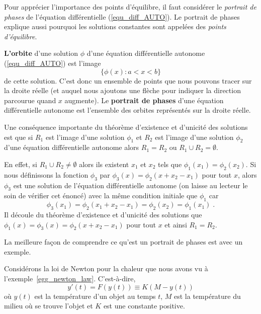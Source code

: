 {Pour apprécier l'importance des points d'équilibre, il faut considérer
le {\em portrait de phases} de l'équation différentielle
(\ref{equ_diff_AUTO}).  Le portrait de phases explique aussi pourquoi
les solutions constantes sont appelées des {\em points d'équilibre}.

\begin{focus}{\dfn}
{\bfseries L'orbite} d'une solution $\phi$ d'une équation
différentielle autonome (\ref{equ_diff_AUTO}) est l'image
\[
\{ \phi(x) :  a < x < b \}
\]
de cette solution.  C'est donc un ensemble de points que nous pouvons
tracer sur la droite réelle (et auquel nous ajoutons une flèche pour
indiquer la direction parcourue quand $x$ augmente).
Le {\bfseries portrait de phases} d'une équation différentielle
autonome est l'ensemble des orbites représentés sur la droite
réelle. 
\end{focus}

\begin{rmk}[\theory]
Une conséquence importante du théorème d'existence et d'unicité des
solutions est que si $R_1$ est l'image d'une solution $\phi_1$ et
$R_2$ est l'image d'une solution $\phi_2$ d'une équation
différentielle autonome alors $R_1 = R_2$ ou $R_1 \cup R_2 = \emptyset$. 

En effet, si $R_1 \cup R_2 \neq \emptyset$ alors ils existent $x_1$ et
$x_2$ tels que $\phi_1(x_1) = \phi_2(x_2)$.  Si nous définissons la fonction
$\phi_3$ par $\phi_3(x) = \phi_2(x+x_2-x_1)$ pour tout $x$, alors
$\phi_3$ est une solution de l'équation différentielle autonome (on
laisse au lecteur le soin de vérifier cet énoncé) avec la même
condition initiale que $\phi_1$ car
\[
\phi_3(x_1) = \phi_2(x_1+x_2-x_1) = \phi_2(x_2) = \phi_1(x_1) \; .
\]
Il découle du théorème d'existence et d'unicité des solutions que
$\phi_1(x) = \phi_3(x) = \phi_2(x+x_2-x_1)$ pour tout $x$ et ainsi
$R_1 = R_2$.
\label{dist_img}
\end{rmk}

La meilleure façon de comprendre ce qu'est un portrait de phases est
avec un exemple.

\begin{egg}
Considérons la loi de Newton pour la chaleur que nous avons vu à
l'exemple~\ref{egg_newton_law}.  C'est-à-dire,
\begin{equation}\label{newton2}
y'(t) = F(y(t)) \equiv K ( M - y(t) )
\end{equation}
où $y(t)$ est la température d'un objet au temps $t$, $M$ est la
température du milieu où se trouve l'objet et $K$ est une
constante positive.


\end{egg}}
